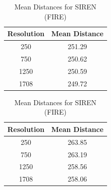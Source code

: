 \begin{table}[h]
    \centering
    \begin{minipage}[t]{0.45\linewidth}
        \centering
        \begin{tabular}{|c|c|}
        \hline
        Resolution & Mean Distance \\ \hline
        250 & 251.29 \\ \hline
        750 & 250.62 \\ \hline
        1250 & 250.59 \\ \hline
        1708 & 249.72 \\ \hline
        \end{tabular}
        \caption{Mean Distances for Relu (FIRE)}
        \label{tab:mlp_mean_distances_fire}
    \end{minipage}
    \hfill
    \begin{minipage}[t]{0.45\linewidth}
        \centering
        \begin{tabular}{|c|c|}
        \hline
        Resolution & Mean Distance \\ \hline
        250 & 263.85 \\ \hline
        750 & 263.19 \\ \hline
        1250 & 258.56 \\ \hline
        1708 & 258.06 \\ \hline
        \end{tabular}
        \caption{Mean Distances for SIREN (FIRE)}
        \label{tab:siren_mean_distances_fire}
    \end{minipage}
\end{table}

